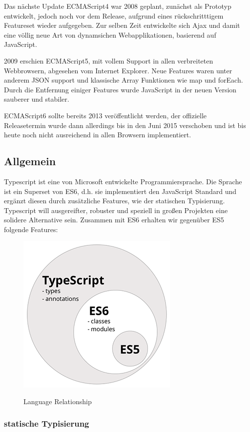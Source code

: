 Das nächste Update ECMAScript4 war 2008 geplant, zunächst als Prototyp entwickelt,
jedoch noch vor dem Release, aufgrund eines rückschritttigem Featureset wieder aufgegeben.
Zur selben Zeit entwickelte sich Ajax und damit eine völlig neue Art von dynamsichen Webapplikationen,
basierend auf JavaScript.

2009 erschien ECMAScript5, mit vollem Support in allen verbreiteten Webbrowsern, abgesehen vom Internet Explorer.
Neue Features waren unter anderem JSON support und klassische Array Funktionen wie map und forEach.
Durch die Entfernung einiger Features wurde JavaScript in der neuen Version sauberer und stabiler.

ECMAScript6 sollte bereits 2013 veröffentlicht werden, der offizielle Releasetermin wurde
dann allerdings bis in den Juni 2015 verschoben und ist bis heute noch nicht ausreichend in allen Browsern implementiert.
\cite{js-vs-es}

\subsection{Allgemein}

Typescript ist eine von Microsoft entwickelte Programmiersprache.
Die Sprache ist ein Superset von ES6, d.h. sie implementiert den JavaScript Standard und ergänzt diesen
durch zusätzliche Features, wie der statischen Typisierung.
Typescript will ausgereifter, robuster und speziell in großen Projekten eine solidere Alternative sein. \cite[28]{EssentialTS}
Zusammen mit ES6 erhalten wir gegenüber ES5 folgende Features:

\begin{figure}[ht]
 \centering
 \includegraphics[width=0.4\linewidth]{kapitel2/typescript----es5-es6-typescript-circle-diagram.png}
 \caption{Language Relationship}\cite[152]{ng-Book-2}
\end{figure}


\subsubsection{statische Typisierung}

